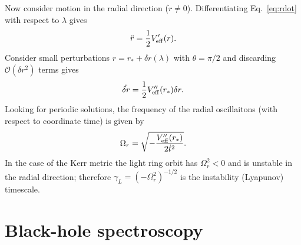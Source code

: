 Now consider motion in the radial direction ($\dot{r}\neq 0$).
Differentiating Eq.~\ref{eq:rdot} with respect to $\lambda$ gives
\begin{align}
	\ddot{r} = \frac{1}{2}V'_{\rm eff}(r).
\end{align}
Consider small perturbations $r = r_*+\delta r(\lambda)$ with $\theta = \pi/2$ and discarding $\mathcal{O}(\delta r^2)$ terms gives
\begin{align}
	\ddot{\delta r} = \frac{1}{2}V''_{\rm eff}(r_*)\delta r.
\end{align}
Looking for periodic solutions, the frequency of the radial oscillaitons (with respect to coordinate time) is given by
\begin{align}
	\Omega_{r} = \sqrt{-\frac{V''_{\rm eff}(r_*)}{2\dot{t}^2}}.
\end{align}
In the case of the Kerr metric the light ring orbit has $\Omega_r^2<0$ and is unstable in the radial direction; therefore $\gamma_L = (-\Omega_r^2)^{-1/2}$ is the instability (Lyapunov) timescale.

\section{Black-hole spectroscopy}
\label{ch1:sec:bh_spectroscopy}

